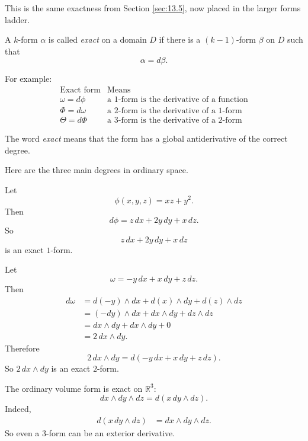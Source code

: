 This is the same exactness from Section \ref{sec:13.5}, now placed in the larger
forms ladder.

\begin{definition}
A \(k\)-form \(\alpha\) is called \emph{exact} on a domain \(D\) if there is a
\((k-1)\)-form \(\beta\) on \(D\) such that
\[
\boxed{
    \alpha=d\beta.
}
\]

For example:
\[
\begin{array}{c|c}
\text{Exact form} & \text{Means} \\ \hline
\omega=d\phi & \text{a \(1\)-form is the derivative of a function}\\[1mm]
\Phi=d\omega & \text{a \(2\)-form is the derivative of a \(1\)-form}\\[1mm]
\Theta=d\Phi & \text{a \(3\)-form is the derivative of a \(2\)-form}
\end{array}
\]
\end{definition}

The word \emph{exact} means that the form has a global antiderivative of the correct
degree.

Here are the three main degrees in ordinary space.

\begin{example}
Let
\[
    \phi(x,y,z)=xz+y^2.
\]
Then
\[
\boxed{
    d\phi=z\,dx+2y\,dy+x\,dz.
}
\]
So
\[
    z\,dx+2y\,dy+x\,dz
\]
is an exact \(1\)-form.
\end{example}

\begin{example}
Let
\[
    \omega=-y\,dx+x\,dy+z\,dz.
\]
Then
\[
\begin{aligned}
d\omega
&=
d(-y)\wedge dx+d(x)\wedge dy+d(z)\wedge dz\\
&=
(-dy)\wedge dx+dx\wedge dy+dz\wedge dz\\
&=
dx\wedge dy+dx\wedge dy+0\\
&=
2\,dx\wedge dy.
\end{aligned}
\]
Therefore
\[
\boxed{
    2\,dx\wedge dy=d(-y\,dx+x\,dy+z\,dz).
}
\]
So \(2\,dx\wedge dy\) is an exact \(2\)-form.
\end{example}

\begin{example}
The ordinary volume form is exact on \(\mathbb R^3\):
\[
\boxed{
    dx\wedge dy\wedge dz=d(x\,dy\wedge dz).
}
\]
Indeed,
\[
\begin{aligned}
d(x\,dy\wedge dz)
&=
dx\wedge dy\wedge dz.
\end{aligned}
\]
So even a \(3\)-form can be an exterior derivative.
\end{example}

